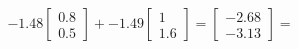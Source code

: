 \documentclass[preview]{standalone}
\begin{document}
\begin{align*}
-1.48 \begin{bmatrix} 0.8 \\ 0.5 \end{bmatrix} + -1.49 \begin{bmatrix} 1 \\ 1.6 \end{bmatrix} = \begin{bmatrix} -2.68 \\ -3.13 \end{bmatrix} =
\end{align*}
\end{document}
